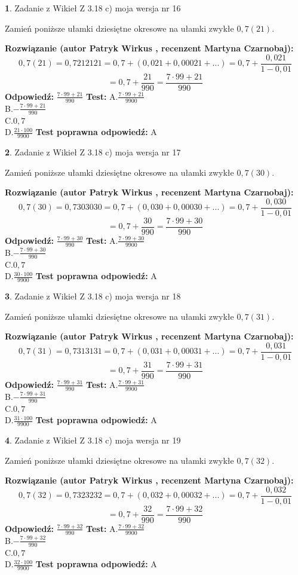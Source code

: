 \documentclass[12pt, a4paper]{article}
\theoremstyle{definition} %
\newtheorem{zad}{}
\newcommand{\zadStart}[1]{\begin{zad}#1\newline}
\newcommand{\zadStop}{\end{zad}}
\newcommand{\rozwStart}[2]{\noindent \textbf{Rozwiązanie (autor #1 , recenzent #2): }\newline}
\newcommand{\rozwStop}{\newline}
\newcommand{\odpStart}{\noindent \textbf{Odpowiedź:}\newline}
\newcommand{\odpStop}{\newline}
\newcommand{\testStart}{\noindent \textbf{Test:}\newline}
\newcommand{\testStop}{\newline}
\newcommand{\kluczStart}{\noindent \textbf{Test poprawna odpowiedź:}\newline}
\newcommand{\kluczStop}{\newline}
\begin{document}
\zadStart{Zadanie z Wikieł Z 3.18 c) moja wersja nr 16}

Zamień poniższe ułamki dziesiętne okresowe na ułamki zwykłe $0,7(21)$.
\zadStop
\rozwStart{Patryk Wirkus}{Martyna Czarnobaj}
$$0,7(21)=0,7212121=0,7+(0,021+0,00021+...)=0,7+\frac{0,021}{1-0,01}$$
$$=0,7+\frac{21}{990}=\frac{7\cdot99+21}{990}$$
\rozwStop
\odpStart
$\frac{7\cdot99+21}{990}$
\odpStop
\testStart
A.$\frac{7\cdot99+21}{9900}$\\ B.$-\frac{7\cdot99+21}{990}$\\ C.$0,7$\\ D.$\frac{21\cdot100}{9900}$
\testStop
\kluczStart
A
\kluczStop



\zadStart{Zadanie z Wikieł Z 3.18 c) moja wersja nr 17}

Zamień poniższe ułamki dziesiętne okresowe na ułamki zwykłe $0,7(30)$.
\zadStop
\rozwStart{Patryk Wirkus}{Martyna Czarnobaj}
$$0,7(30)=0,7303030=0,7+(0,030+0,00030+...)=0,7+\frac{0,030}{1-0,01}$$
$$=0,7+\frac{30}{990}=\frac{7\cdot99+30}{990}$$
\rozwStop
\odpStart
$\frac{7\cdot99+30}{990}$
\odpStop
\testStart
A.$\frac{7\cdot99+30}{9900}$\\ B.$-\frac{7\cdot99+30}{990}$\\ C.$0,7$\\ D.$\frac{30\cdot100}{9900}$
\testStop
\kluczStart
A
\kluczStop



\zadStart{Zadanie z Wikieł Z 3.18 c) moja wersja nr 18}

Zamień poniższe ułamki dziesiętne okresowe na ułamki zwykłe $0,7(31)$.
\zadStop
\rozwStart{Patryk Wirkus}{Martyna Czarnobaj}
$$0,7(31)=0,7313131=0,7+(0,031+0,00031+...)=0,7+\frac{0,031}{1-0,01}$$
$$=0,7+\frac{31}{990}=\frac{7\cdot99+31}{990}$$
\rozwStop
\odpStart
$\frac{7\cdot99+31}{990}$
\odpStop
\testStart
A.$\frac{7\cdot99+31}{9900}$\\ B.$-\frac{7\cdot99+31}{990}$\\ C.$0,7$\\ D.$\frac{31\cdot100}{9900}$
\testStop
\kluczStart
A
\kluczStop



\zadStart{Zadanie z Wikieł Z 3.18 c) moja wersja nr 19}

Zamień poniższe ułamki dziesiętne okresowe na ułamki zwykłe $0,7(32)$.
\zadStop
\rozwStart{Patryk Wirkus}{Martyna Czarnobaj}
$$0,7(32)=0,7323232=0,7+(0,032+0,00032+...)=0,7+\frac{0,032}{1-0,01}$$
$$=0,7+\frac{32}{990}=\frac{7\cdot99+32}{990}$$
\rozwStop
\odpStart
$\frac{7\cdot99+32}{990}$
\odpStop
\testStart
A.$\frac{7\cdot99+32}{9900}$\\ B.$-\frac{7\cdot99+32}{990}$\\ C.$0,7$\\ D.$\frac{32\cdot100}{9900}$
\testStop
\kluczStart
A
\kluczStop
\end{document}
